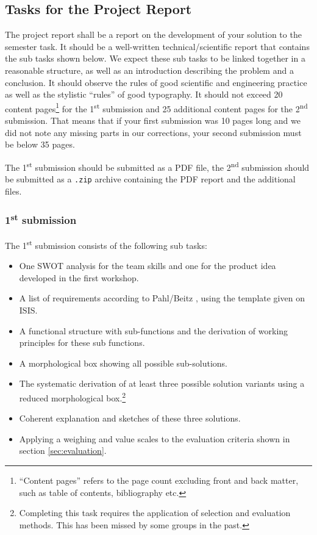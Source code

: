 \documentclass[headinclude=true]{scrartcl}
\begin{document}
\subsection{Tasks for the Project Report}

The project report shall be a report on the development of your solution to the semester task. It should be a well-written technical/scientific report that contains the sub tasks shown below. We expect these sub tasks to be linked together in a reasonable structure, as well as an introduction describing the problem and a conclusion. It should observe the rules of good scientific and engineering practice as well as the stylistic ``rules'' of good typography. It should not exceed 20 content pages\footnote{``Content pages'' refers to the page count excluding front and back matter, such as table of contents, bibliography etc.} for the 1\textsuperscript{st} submission and 25 additional content pages for the 2\textsuperscript{nd} submission. That means that if your first submission was 10 pages long and we did not note any missing parts in our corrections, your second submission must be below 35 pages.

The 1\textsuperscript{st} submission should be submitted as a PDF file, the 2\textsuperscript{nd} submission should be submitted as a \texttt{.zip} archive containing the PDF report and the additional files.

\subsubsection{1\textsuperscript{st} submission}
The 1\textsuperscript{st} submission consists of the following sub tasks:
\begin{itemize}
 \item One SWOT analysis for the team skills and one for the product idea developed in the first workshop.
 \item A list of requirements according to Pahl/Beitz \cite{Pahl2007}, using the template given on ISIS.
 \item A functional structure with sub-functions and the derivation of working principles for these sub functions.
 \item A morphological box showing all possible sub-solutions.
 \item The systematic derivation of at least three possible solution variants using a reduced morphological box.\footnote{Completing this task requires the application of selection and evaluation methods. This has been missed by some groups in the past.}
 \item Coherent explanation and sketches of these three solutions.
 \item Applying a weighing and value scales to the evaluation criteria shown in section \ref{sec:evaluation}.
\end{itemize}
\end{document}
